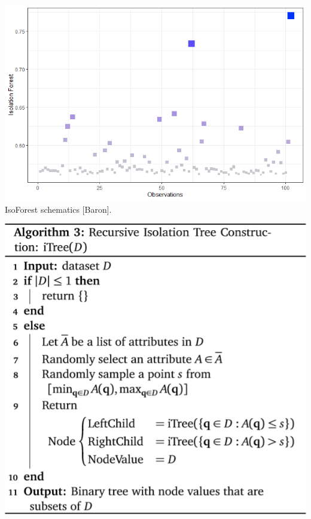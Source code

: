 \documentclass[20pt,landscape,footrule,headrule]{foils}
\begin{document}
{{\begin{center}
\includegraphics[width=\textwidth]{Images/IsoForest.png} \\ 
IsoForest schematics [Baron].
\end{center}
\newpage
\begin{center}\includegraphics[height=\textheight]{Images/Algorithm3}
\end{center}
\newpage\ \begin{center}
\end{center}
\newpage\ \begin{center}

\end{center}}}
\end{document}
